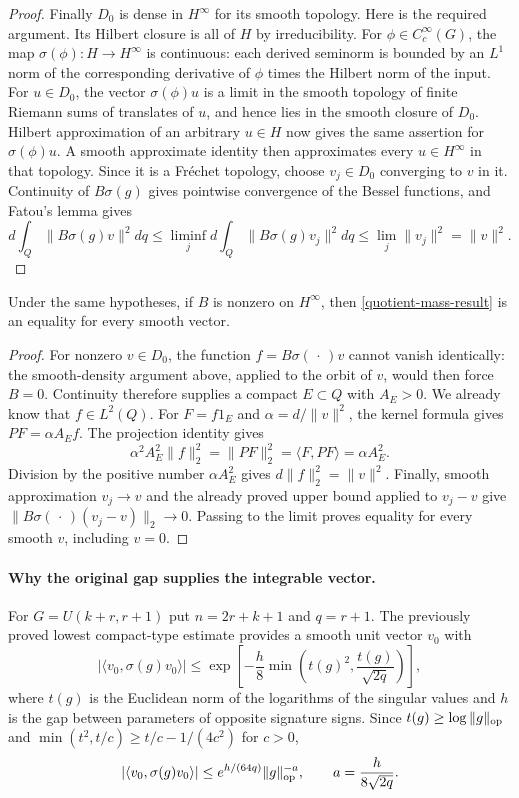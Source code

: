 \begin{proof}
Finally $D_0$ is dense in $H^\infty$ for its smooth topology.
Here is the required argument.  Its Hilbert closure is all of $H$
by irreducibility.  For $\phi\in C_c^\infty(G)$, the map
$\sigma(\phi):H\to H^\infty$ is continuous: each derived seminorm
is bounded by an $L^1$ norm of the corresponding derivative of
$\phi$ times the Hilbert norm of the input.  For $u\in D_0$,
the vector $\sigma(\phi)u$ is a limit in the smooth topology of
finite Riemann sums of translates of $u$, and hence lies in the
smooth closure of $D_0$.  Hilbert approximation of an arbitrary
$u\in H$ now gives the same assertion for $\sigma(\phi)u$.
A smooth approximate identity then approximates every
$u\in H^\infty$ in that topology.  Since it is a Fr\'echet
topology, choose $v_j\in D_0$ converging to $v$ in it.
Continuity of $B\sigma(g)$ gives pointwise convergence of the
Bessel functions, and Fatou's lemma gives
\[
 d\int_Q\|B\sigma(g)v\|^2dq
   \le\liminf_j d\int_Q\|B\sigma(g)v_j\|^2dq
   \le\lim_j\|v_j\|^2=\|v\|^2.
\]
\end{proof}

\begin{corollary}\label{original-quotient-mass-isometry}
Under the same hypotheses, if $B$ is nonzero on $H^\infty$, then
\eqref{quotient-mass-result} is an equality for every smooth vector.
\end{corollary}
\begin{proof}
For nonzero $v\in D_0$, the function $f=B\sigma(\,\cdot\,)v$
cannot vanish identically: the smooth-density argument above,
applied to the orbit of $v$, would then force $B=0$.  Continuity
therefore supplies a compact $E\subset Q$ with $A_E>0$.
We already know that $f\in L^2(Q)$.  For $F=f1_E$ and
$\alpha=d/\|v\|^2$, the kernel formula gives $PF=\alpha A_Ef$.
The projection identity gives
\[
 \alpha^2A_E^2\|f\|_2^2=\|PF\|_2^2
      =\langle F,PF\rangle=\alpha A_E^2.
\]
Division by the positive number $\alpha A_E^2$ gives
$d\|f\|_2^2=\|v\|^2$.  Finally, smooth approximation $v_j\to v$
and the already proved upper bound applied to $v_j-v$ give
$\|B\sigma(\,\cdot\,)(v_j-v)\|_2\to0$.  Passing to the limit
proves equality for every smooth $v$, including $v=0$.
\end{proof}

\paragraph{Why the original gap supplies the integrable vector.}
For $G=U(k+r,r+1)$ put $n=2r+k+1$ and $q=r+1$.  The previously
proved lowest compact-type estimate \cite{quotient-mass-lowest-type}
provides a smooth unit vector $v_0$ with
\[
 |\langle v_0,\sigma(g)v_0\rangle|
 \le\exp\left[-\frac h8
          \min\left(t(g)^2,\frac{t(g)}{\sqrt{2q}}\right)\right],
\]
where $t(g)$ is the Euclidean norm of the logarithms of the singular
values and $h$ is the gap between parameters of opposite signature
signs.
Since $t(g)\ge\log\|g\|_{\rm op}$ and
$\min(t^2,t/c)\ge t/c-1/(4c^2)$ for $c>0$,
\begin{equation}\label{quotient-mass-decay}
 |\langle v_0,\sigma(g)v_0\rangle|
      \le e^{h/(64q)}\|g\|_{\rm op}^{-a},
             \qquad a=\frac h{8\sqrt{2q}}.
\end{equation}

